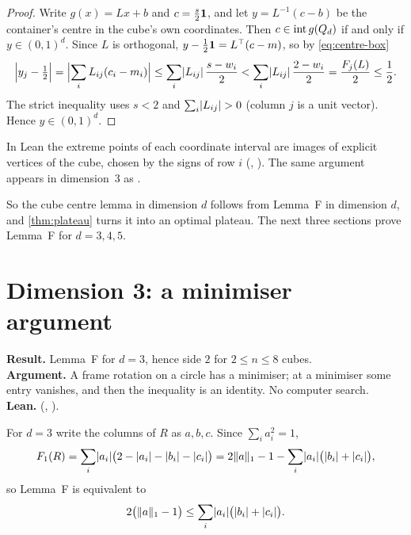 \documentclass[11pt,a4paper]{article}
\begin{document}
\begin{proof}
Write $g(x)=Lx+b$ and $c=\frac s2\mathbf 1$, and let $y=L^{-1}(c-b)$ be the container's centre in the cube's own coordinates. Then $c\in\operatorname{int} g(Q_d)$ if and only if $y\in(0,1)^d$. Since $L$ is orthogonal, $y-\frac12\mathbf 1=L^{\top}(c-m)$, so by \eqref{eq:centre-box}
\[
\Bigl\lvert y_j-\tfrac12\Bigr\rvert=\Bigl\lvert\sum_i L_{ij}(c_i-m_i)\Bigr\rvert\le\sum_i\lvert L_{ij}\rvert\,\frac{s-w_i}2<\sum_i\lvert L_{ij}\rvert\,\frac{2-w_i}2=\frac{F_j(L)}2\le\frac12 .
\]
The strict inequality uses $s<2$ and $\sum_i\lvert L_{ij}\rvert>0$ (column $j$ is a unit vector). Hence $y\in(0,1)^d$.
\end{proof}

In Lean the extreme points of each coordinate interval are images of explicit vertices of the cube, chosen by the signs of row $i$ (, ). The same argument appears in dimension~3 as .

So the cube centre lemma in dimension $d$ follows from Lemma~F in dimension $d$, and \cref{thm:plateau} turns it into an optimal plateau. The next three sections prove Lemma~F for $d=3,4,5$.

\section{Dimension 3: a minimiser argument}\label{sec:d3}

\begin{summarybox}
\textbf{Result.} Lemma~F for $d=3$, hence side $2$ for $2\le n\le8$ cubes.\\
\textbf{Argument.} A frame rotation on a circle has a minimiser; at a minimiser some entry vanishes, and then the inequality is an identity. No computer search.\\
\textbf{Lean.}  (, ).
\end{summarybox}

For $d=3$ write the columns of $R$ as $a,b,c$. Since $\sum_ia_i^2=1$,
\[
F_1(R)=\sum_i\lvert a_i\rvert\bigl(2-\lvert a_i\rvert-\lvert b_i\rvert-\lvert c_i\rvert\bigr)=2\lVert a\rVert_1-1-\sum_i\lvert a_i\rvert\bigl(\lvert b_i\rvert+\lvert c_i\rvert\bigr),
\]
so Lemma~F is equivalent to
\begin{equation}\label{eq:core}
2\bigl(\lVert a\rVert_1-1\bigr)\le\sum_i\lvert a_i\rvert\bigl(\lvert b_i\rvert+\lvert c_i\rvert\bigr).
\end{equation}
\end{document}
